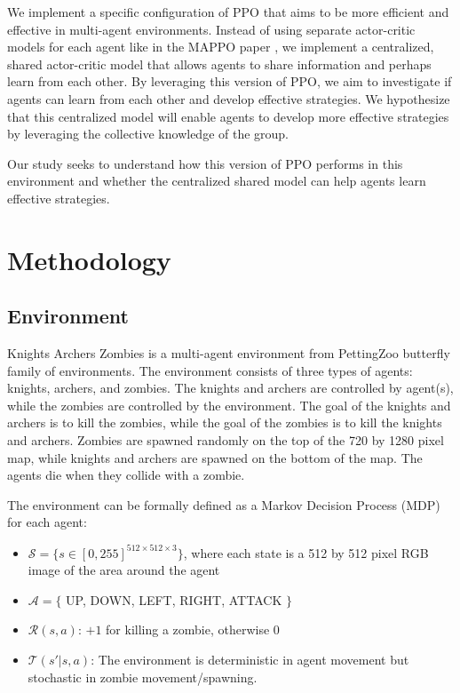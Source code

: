 \documentclass{article}
\begin{document}
We implement a specific configuration of PPO that aims to be more efficient and effective in
multi-agent environments. Instead of using separate actor-critic models for each agent 
like in the MAPPO paper \cite{DBLP:journals/corr/abs-2103-01955}, we implement a
centralized, shared actor-critic model that allows agents to share information
and perhaps learn from each other. By leveraging this version of PPO, we aim to investigate if agents can 
learn from each other and develop effective strategies. We hypothesize that this 
centralized model will enable agents to develop more effective strategies by 
leveraging the collective knowledge of the group.

Our study seeks to understand how this version of PPO performs in this environment and
whether the centralized shared model can help agents learn effective strategies.

\section{Methodology}
\label{sec:headings}

\subsection{Environment}
Knights Archers Zombies is a multi-agent environment from PettingZoo butterfly family of environments.
The environment consists of three types of agents: knights, archers, and zombies. The knights and archers
are controlled by agent(s), while the zombies are controlled by the environment. The goal of the knights
and archers is to kill the zombies, while the goal of the zombies is to kill the knights and archers. 
Zombies are spawned randomly on the top of the 720 by 1280 pixel map, while knights and archers are spawned
on the bottom of the map. The agents die when they collide with a zombie. 

The environment can be formally defined as a Markov Decision Process (MDP) for each agent:
\begin{itemize}
  \item $\mathcal{S} = \{ s \in [0, 255]^{512 \times 512 \times 3} \}$, where each state is a 512 by 512 pixel RGB image of the area around the agent
  \item $\mathcal{A} = \{$ UP, DOWN, LEFT, RIGHT, ATTACK $\}$
  \item $\mathcal{R}(s, a)$: $+1$ for killing a zombie, otherwise $0$
  \item $\mathcal{T}(s'|s,a)$: The environment is deterministic in agent movement but stochastic in zombie movement/spawning.
\end{itemize}
\end{document}
